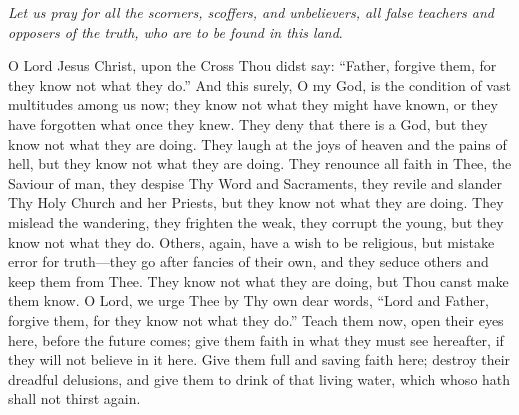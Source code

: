 \emph{Let us pray for all the
scorners, scoffers, and unbelievers, all false teachers and opposers of
the truth, who are to be found in this land}.

O Lord Jesus Christ, upon the
Cross Thou didst say: ``Father, forgive them, for they know not what they
do.'' And this surely, O my God, is the condition of vast multitudes
among us now; they know not what they might have known, or they have
forgotten what once they knew. They deny that there is a God, but they
know not what they are doing. They laugh at the joys of heaven and the
pains of hell, but they know not what they are doing. They renounce all
faith in Thee, the Saviour of man, they despise Thy Word and Sacraments,
they revile and slander Thy Holy Church and her Priests, but they know
not what they are doing. They mislead the wandering, they frighten the
weak, they corrupt the young, but they know not what they do. Others,
again, have a wish to be religious, but mistake error for truth—they
go after fancies of their own, and they seduce others and keep them from
Thee. They know not what they are doing, but Thou canst make them know.
O Lord, we urge Thee by Thy own dear words, ``Lord and Father,
forgive them, for they know not what they do.'' Teach them now, open
their eyes here, before the future comes; give them faith in what they
must see hereafter, if they will not believe in it here. Give them full
and saving faith here; destroy their dreadful delusions, and give them
to drink of that living water, which whoso hath shall not thirst again.


